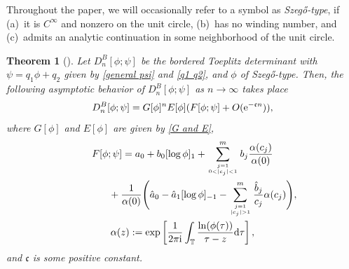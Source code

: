 \documentclass[pdftex]{sigma}
\numberwithin{equation}{section}
\newtheorem{Theorem}{Theorem}[section]
\newcommand{\T}{{\mathbb T}}
\newcommand{\al}{\alpha}
\begin{document}
\begin{Definition}
Throughout the paper, we will occasionally refer to a symbol as \textit{Szeg\H{o}-type}, if (a)~it is $C^{\infty}$ and nonzero on the unit circle, (b)~has no winding number, and (c)~admits an analytic continuation in some neighborhood of the unit circle.
\end{Definition}

\begin{Theorem}[\cite{BEGIL}]\label{main thm}
	Let $D^{B}_{n}[\phi; \psi]$ be the bordered Toeplitz determinant with $\psi=q_1 \phi + q_2$ given by \eqref{general psi} and \eqref{q1 q2}, and $\phi$ of Szeg\H{o}-type. Then, the following asymptotic behavior of $D^{B}_{n}[\phi; \psi]$ as $n \to \infty$ takes place
	\[%
			D^B_{n}[\phi ; \psi ] =
			G[\phi]^{n} E[\phi](F[\phi;\psi] + O({\rm e}^{-\mathfrak{c}n})),
		\]
		where $G[\phi]$ and $E[\phi]$ are given by \eqref{G and E},
		\begin{gather}
			F[\phi;\psi] =	
			a_0+ b_0 [\log \phi]_{1} +
		\sum^m_{j=1 \atop 0<|c_j|<1} b_j \frac{\al(c_j)}{\alpha(0)}\nonumber\\
			\phantom{F[\phi;\psi] =}{}+	
			\frac{1}{\al(0)}\Bigg(
			\hat{a}_0-\hat{a}_1[\log \phi]_{-1} -
			\sum^{m}_{j=1 \atop |c_j|>1 }\frac{\hat{b}_j}{c_j} \al(c_j) \Bigg),\label{ConstantF2}\\
			\al(z):= \exp \left[ \frac{1}{2 \pi {\rm i} } \int_{\T} \frac{\ln(\phi(\tau))}{\tau-z}{\rm d}\tau \right],\label{al}
		\end{gather}
		and $\mathfrak{c}$ is some positive constant.
	\end{Theorem}
	
\end{document}
